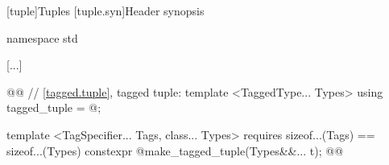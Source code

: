 \setcounter{section}{4}
[tuple]{Tuples}
[tuple.syn]{Header  synopsis}
\begin{codeblock}
namespace std {
  [...]

  @@
  // \ref{tagged.tuple}, tagged tuple:
  template <TaggedType... Types>
  using tagged_tuple = @\seebelow@;

  template <TagSpecifier... Tags, class... Types>
    requires sizeof...(Tags) == sizeof...(Types)
      constexpr @\seebelow@ make_tagged_tuple(Types&&... t);
  @\oldtxt{\}\}\}}@
}
\end{codeblock}


